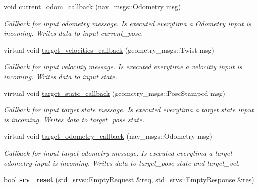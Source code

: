 \begin{DoxyCompactItemize}
\item 
void \hyperlink{classController_a35b38608f67e7c1c34f6b7186db32ad7}{current\+\_\+odom\+\_\+callback} (nav\+\_\+msgs\+::\+Odometry msg)\hypertarget{classController_a35b38608f67e7c1c34f6b7186db32ad7}{}\label{classController_a35b38608f67e7c1c34f6b7186db32ad7}

\begin{DoxyCompactList}\small\item\em Callback for input odometry message. Is executed everytima a Odometry input is incoming. Writes data to input current\+\_\+pose. \end{DoxyCompactList}\item 
virtual void \hyperlink{classController_afa31080c1ed1e652410c5e97472b3ea5}{target\+\_\+velocities\+\_\+callback} (geometry\+\_\+msgs\+::\+Twist msg)\hypertarget{classController_afa31080c1ed1e652410c5e97472b3ea5}{}\label{classController_afa31080c1ed1e652410c5e97472b3ea5}

\begin{DoxyCompactList}\small\item\em Callback for input velocitiy message. Is executed everytime a velocitiy input is incoming. Writes data to input state. \end{DoxyCompactList}\item 
virtual void \hyperlink{classController_a60f59dd761ce2d41dc9254f87164ded1}{target\+\_\+state\+\_\+callback} (geometry\+\_\+msgs\+::\+Pose\+Stamped msg)\hypertarget{classController_a60f59dd761ce2d41dc9254f87164ded1}{}\label{classController_a60f59dd761ce2d41dc9254f87164ded1}

\begin{DoxyCompactList}\small\item\em Callback for input target state message. Is executed everytima a target state input is incoming. Writes data to target\+\_\+pose state. \end{DoxyCompactList}\item 
virtual void \hyperlink{classController_ad9ccaff0c6f9989bd6c33a3d2179124d}{target\+\_\+odometry\+\_\+callback} (nav\+\_\+msgs\+::\+Odometry msg)\hypertarget{classController_ad9ccaff0c6f9989bd6c33a3d2179124d}{}\label{classController_ad9ccaff0c6f9989bd6c33a3d2179124d}

\begin{DoxyCompactList}\small\item\em Callback for input target odometry message. Is executed everytima a target odometry input is incoming. Writes data to target\+\_\+pose state and target\+\_\+vel. \end{DoxyCompactList}\item 
bool {\bfseries srv\+\_\+reset} (std\+\_\+srvs\+::\+Empty\+Request \&req, std\+\_\+srvs\+::\+Empty\+Response \&res)\hypertarget{classController_ae24861b9ecd088dc3a58db860fc417b1}{}\label{classController_ae24861b9ecd088dc3a58db860fc417b1}


\end{DoxyCompactItemize}
